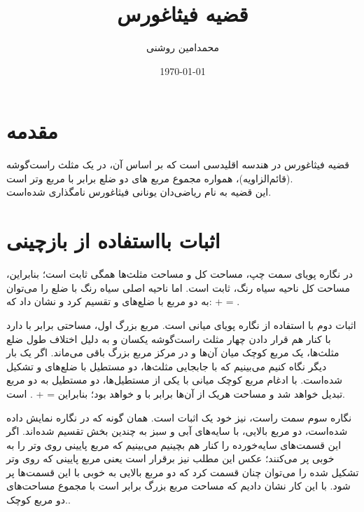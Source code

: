 \documentclass[12pt,onecolumn,a4paper]{article}
\begin{document}
\title{قضیه فیثاغورس} 
\author{محمدامین روشنی}
\date{\today}
\maketitle
\tableofcontents
\newpage
\section{مقدمه} 
قضیه فیثاغورس در هندسه اقلیدسی است که بر اساس آن، در یک مثلث راست‌گوشه (قائم‌الزاویه)، همواره مجموع مربع ‌های دو ضلع برابر با مربع وتر است.
\\
این قضیه به نام ریاضی‌دان یونانی فیثاغورس نامگذاری شده‌است.


\section{اثبات بااستفاده از بازچینی}
\label{sec1}
در نگاره پویای سمت چپ، مساحت کل و مساحت مثلث‌ها همگی ثابت است؛ بنابراین، مساحت کل ناحیه سیاه رنگ، ثابت است. اما ناحیه اصلی سیاه رنگ با ضلع  را می‌توان به دو مربع با ضلع‌های  و  تقسیم کرد و نشان داد که:  +  = .

اثبات دوم با استفاده از نگاره پویای میانی است. مربع بزرگ اول، مساحتی برابر با  دارد با کنار هم قرار دادن چهار مثلث راست‌گوشه یکسان و به دلیل اختلاف طول ضلع مثلث‌ها، یک مربع کوچک میان آن‌ها و در مرکز مربع بزرگ باقی می‌ماند. اگر یک بار دیگر نگاه کنیم می‌بینیم که با جابجایی مثلث‌ها، دو مستطیل با ضلع‌های  و  تشکیل شده‌است. با ادغام مربع کوچک میانی با یکی از مستطیل‌ها، دو مستطیل به دو مربع تبدیل خواهد شد و مساحت هریک از آن‌ها برابر با  و  خواهد بود؛ بنابراین  =  + . است.

نگاره سوم سمت راست، نیز خود یک اثبات است. همان گونه که در نگاره نمایش داده شده‌است، دو مربع بالایی، با سایه‌های آبی و سبز به چندین بخش تقسیم شده‌اند. اگر این قسمت‌های سایه‌خورده را کنار هم بچینیم می‌بینیم که مربع پایینی روی وتر را به خوبی پر می‌کنند؛ عکس این مطلب نیز برقرار است یعنی مربع پایینی که روی وتر تشکیل شده را می‌توان چنان قسمت کرد که دو مربع بالایی به خوبی با این قسمت‌ها پر شود. با این کار نشان دادیم که مساحت مربع بزرگ برابر است با مجموع مساحت‌های دو مربع کوچک..
\end{document}
